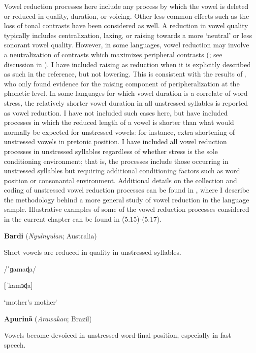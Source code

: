   Vowel reduction processes here include any process by which the vowel is deleted or reduced in quality, duration, or voicing. Other less common effects such as the loss of tonal contrasts have been considered as well. A reduction in vowel quality typically includes centralization, laxing, or raising towards a more ‘neutral’ or less sonorant vowel quality. However, in some languages, vowel reduction may involve a neutralization of contrasts which maximizes peripheral contrasts (\citealt{Crosswhite2001}; see discussion in ). I have included raising as reduction when it is explicitly described as such in the reference, but not lowering. This is consistent with the results of \citet{KapatsinskiEtAl2019}, who only found evidence for the raising component of peripheralization at the phonetic level. In some languages for which vowel duration is a correlate of word stress, the relatively shorter vowel duration in all unstressed syllables is reported as vowel reduction. I have not included such cases here, but have included processes in which the reduced length of a vowel is shorter than what would normally be expected for unstressed vowels: for instance, extra shortening of unstressed vowels in pretonic position. I have included all vowel reduction processes in unstressed syllables regardless of whether stress is the sole conditioning environment; that is, the processes include those occurring in unstressed syllables but requiring additional conditioning factors such as word position or consonantal environment. Additional details on the collection and coding of unstressed vowel reduction processes can be found in , where I describe the methodology behind a more general study of vowel reduction in the language sample. Illustrative examples of some of the vowel reduction processes considered in the current chapter can be found in (5.15)-(5.17).

\ea\label{ex:(5.15)}
  \textbf{Bardi} (\textit{Nyulnyulan}; Australia)

Short vowels are reduced in quality in unstressed syllables.

/\textsf{ˈ}ɡamaɖa/

[\textsf{ˈ}kamɜɖa]

‘mother’s mother’

\citep[88-90]{Bowern2012}
\z

\ea\label{ex:(5.16)}
  \textbf{Apurinã} (\textit{Arawakan}; Brazil)

Vowels become devoiced in unstressed word-final position, especially in fast speech.

